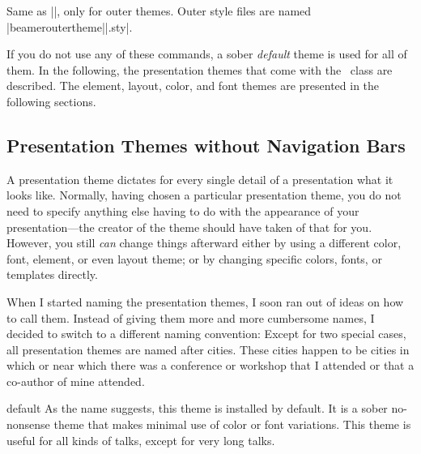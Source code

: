 \begin{command}{\useoutertheme{}}
  Same as |\usetheme|, only for outer themes. Outer style files
  are named |beameroutertheme||.sty|.
\end{command}

If you do not use any of these commands, a sober \emph{default} theme
is used for all of them. In the following, the presentation themes
that come with the \beamer\ class are described. The element, layout,
color, and font themes  are presented in the following sections.



\subsection{Presentation Themes without Navigation Bars}

A presentation theme dictates for every single detail
of a presentation what it looks like. Normally, having chosen a
particular presentation theme, you do not need to specify anything
else having to do with the appearance of your presentation---the
creator of the theme should have taken of that for you. However, you
still \emph{can} change things afterward either by using a different
color, font, element, or even layout theme; or by changing specific
colors, fonts, or templates directly.

When I started naming the presentation themes, I soon ran out of ideas
on how to call them. Instead of giving them more and more cumbersome
names, I decided to switch to a different naming convention:
Except for two special cases, all presentation themes are named after
cities. These cities happen to be cities in which or near which there
was a conference or workshop that I attended or that a
co-author of mine attended. 


\begin{themeexample}{default}
  As the name suggests, this theme is installed by default. It is a
  sober no-nonsense theme that makes minimal use of color or font
  variations. This theme is useful for all kinds of talks, except for
  very long talks.
\end{themeexample}


